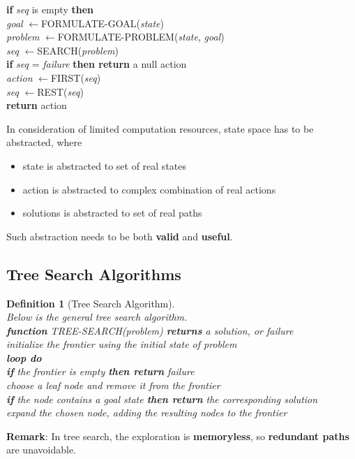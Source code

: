 \documentclass[12pt]{article}
\newcommand{\ind}{\hspace*{15pt}}
\newtheorem{definition}{Definition}[section]
\theoremstyle{definition}
\begin{document}
\ind \textbf{if} \textit{seq} is empty \textbf{then}\\
\ind\ind \textit{goal} $\leftarrow$\textsc{FORMULATE-GOAL}(\textit{state})\\
\ind\ind \textit{problem} $\leftarrow$\textsc{FORMULATE-PROBLEM}(\textit{state}, \textit{goal})\\
\ind\ind \textit{seq} $\leftarrow$\textsc{SEARCH}(\textit{problem})\\
\ind\ind \textbf{if} \textit{seq} = \textit{failure} \textbf{then return} a null action\\
\ind \textit{action} $\leftarrow$\textsc{FIRST}(\textit{seq})\\
\ind \textit{seq} $\leftarrow$\textsc{REST}(\textit{seq})\\
\ind \textbf{return} action

In consideration of limited computation resources, state space has to be abstracted, where
\begin{itemize}
	\item state is abstracted to set of real states
	\item action is abstracted to complex combination of real actions
	\item solutions is abstracted to set of real paths
\end{itemize}
Such abstraction needs to be both \textbf{valid} and \textbf{useful}.
\subsection{Tree Search Algorithms}
\begin{definition}[Tree Search Algorithm]
\hfill\\\normalfont Below is the general tree search algorithm.\\
\textbf{function} \textsc{TREE-SEARCH}(\textit{problem}) \textbf{returns} a solution, or failure\\
\ind initialize the frontier using the initial state of \textit{problem}\\
\ind \textbf{loop do}\\
\ind \ind \textbf{if} the frontier is empty \textbf{then return} failure\\
\ind \ind choose a leaf node and remove it from the frontier\\
\ind \ind \textbf{if} the node contains a goal state \textbf{then return} the corresponding solution\\
\ind \ind expand the chosen node, adding the resulting nodes to the frontier
\end{definition}
\textbf{Remark}: In tree search, the exploration is \textbf{memoryless}, so \textbf{redundant paths} are unavoidable.
\end{document}
